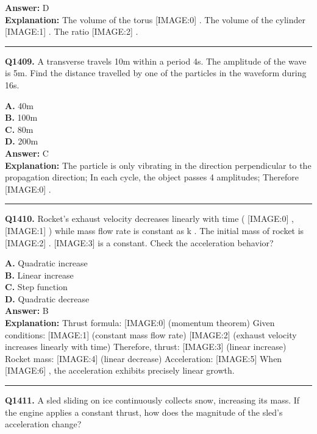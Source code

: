 \documentclass[12pt]{article}
\begin{document}
\textbf{Answer:} D \\
\textbf{Explanation:} The volume of the torus
[IMAGE:0]
. The volume of the cylinder
[IMAGE:1]
. The ratio
[IMAGE:2]
.

\hrule
\vspace{1em}


\noindent
\textbf{Q1409.} A transverse travels 10m within a period 4s. The amplitude of the wave is 5m. Find the distance travelled by one of the particles in the waveform during 16s.



\textbf{A.} 40m \\
\textbf{B.} 100m \\
\textbf{C.} 80m \\
\textbf{D.} 200m \\

\textbf{Answer:} C \\
\textbf{Explanation:} The particle is only vibrating in the direction perpendicular to the propagation direction; In each cycle, the object passes 4 amplitudes; Therefore
[IMAGE:0]
.

\hrule
\vspace{1em}


\noindent
\textbf{Q1410.} Rocket's exhaust velocity decreases linearly with time (
[IMAGE:0]
,
[IMAGE:1]
) while mass flow rate is constant as k
. The initial mass of rocket is
[IMAGE:2]
.
[IMAGE:3]
is a constant.
Check the acceleration behavior?



\textbf{A.} Quadratic increase \\
\textbf{B.} Linear increase \\
\textbf{C.} Step function \\
\textbf{D.} Quadratic decrease \\

\textbf{Answer:} B \\
\textbf{Explanation:} Thrust formula:
[IMAGE:0]
(momentum theorem)
Given conditions:
[IMAGE:1]
(constant mass flow rate)
[IMAGE:2]
(exhaust velocity increases linearly with time)
Therefore, thrust:
[IMAGE:3]
(linear increase)
Rocket mass:
[IMAGE:4]
(linear decrease)
Acceleration:
[IMAGE:5]
When
[IMAGE:6]
, the acceleration exhibits precisely linear growth.

\hrule
\vspace{1em}


\noindent
\textbf{Q1411.} A sled sliding on ice continuously collects snow, increasing its mass. If the engine applies a constant thrust, how does the magnitude of the sled's acceleration change?
\end{document}
